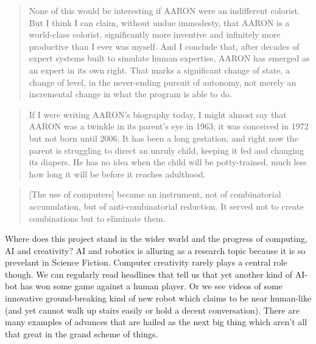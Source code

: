 \documentclass[11pt]{thesis} %
\begin{document}
\begin{quotation}
  None of this would be interesting if AARON were an indifferent colorist. But I think I can claim, without undue immodesty, that AARON is a world-class colorist, significantly more inventive and infinitely more productive than I ever was myself. And I conclude that, after decades of expert systems  built to simulate human expertise, AARON has emerged as an expert in its own right. That marks a significant change of state, a change of level, in the never-ending pursuit of autonomy, not merely an incremental change in what the program is able to do. 
\end{quotation}

\begin{quotation}
  If I were writing AARON's biography today, I might almost say that AARON was a twinkle in its parent's eye in 1963; it was conceived in 1972 but not born until 2006. It has been a long gestation, and right now the parent is struggling to direct an unruly child, keeping it fed and changing its diapers. He has no idea when the child will be potty-trained, much less how long it will be before it reaches adulthood.
\end{quotation}


\begin{quotation}
  [The use of computers] became an instrument, not of combinatorial accumulation, but of anti-combinatorial reduction. It served not to create combinations but to eliminate them.
\end{quotation}


\spirals


Where does this project stand in the wider world and the progress of computing, \ac{AI} and creativity? \ac{AI} and robotics is alluring as a research topic because it is so prevelant in Science Fiction. Computer creativity rarely plays a central role though. We can regularly read headlines that tell us that yet another kind of \ac{AI}-bot has won some game against a human player. Or we see videos of some innovative ground-breaking kind of new robot which claims to be near human-like (and yet cannot walk up stairs easily or hold a decent conversation). There are many examples of advances that are hailed as the next big thing which aren't all that great in the grand scheme of things. 
\end{document}
